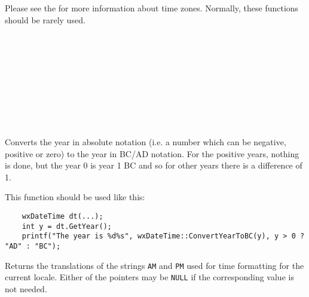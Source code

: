 \label{datetimedstzone}

Please see the  for more
information about time zones. Normally, these functions should be rarely used.

\\
\\
\\
\\
\\
\\
\\
\\




\label{wxdatetimeconvertyeartobc}


Converts the year in absolute notation (i.e. a number which can be negative,
positive or zero) to the year in BC/AD notation. For the positive years,
nothing is done, but the year 0 is year 1 BC and so for other years there is a
difference of 1.

This function should be used like this:

\begin{verbatim}
    wxDateTime dt(...);
    int y = dt.GetYear();
    printf("The year is %d%s", wxDateTime::ConvertYearToBC(y), y > 0 ? "AD" : "BC");
\end{verbatim}


\label{wxdatetimegetampmstrings}


Returns the translations of the strings {\tt AM} and {\tt PM} used for time
formatting for the current locale. Either of the pointers may be {\tt NULL} if
the corresponding value is not needed.


